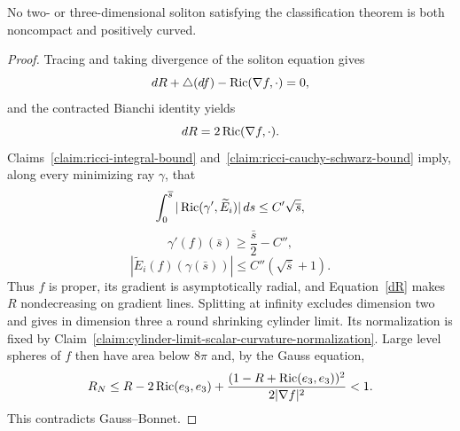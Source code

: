 \begin{proposition}\label{prop:no-noncompact-positive-curvature-soliton}
\label{noncompsol}

No two- or three-dimensional soliton satisfying the classification
theorem is both noncompact and positively curved.
\end{proposition}
\begin{proof}
\sketch Tracing and taking divergence of the soliton equation gives
\begin{equation}\label{Rfeqn}
 dR+\triangle(df)-\operatorname{Ric}(\nabla f,\cdot)=0,
\end{equation}
and the contracted Bianchi identity yields
\begin{equation}\label{dR}
 dR=2\operatorname{Ric}(\nabla f,\cdot).
\end{equation}
Claims~\ref{claim:ricci-integral-bound}
and~\ref{claim:ricci-cauchy-schwarz-bound} imply, along every
minimizing ray $\gamma$, that
\begin{equation}\label{sqrts}
 \int_0^{\overline s}|\operatorname{Ric}(\gamma',\widetilde E_i)|\,ds
 \leq C'\sqrt{\overline s},
\end{equation}
\begin{equation}\label{X}
 \gamma'(f)(\bar s)\geq\frac{\bar s}{2}-C'',
\end{equation}
\begin{equation}\label{sqrts2}
 |\widetilde E_i(f)(\gamma(\bar s))|
 \leq C''(\sqrt{\bar s}+1).
\end{equation}
Thus $f$ is proper, its gradient is asymptotically radial, and
Equation~\ref{dR} makes $R$ nondecreasing on gradient lines.
Splitting at infinity excludes dimension two and gives in dimension
three a round shrinking cylinder limit. Its normalization is fixed
by Claim~\ref{claim:cylinder-limit-scalar-curvature-normalization}.
Large level spheres of $f$ then have area below $8\pi$ and, by the
Gauss equation,
\begin{equation}\label{R_N}
 R_N\leq R-2\operatorname{Ric}(e_3,e_3)
 +\frac{(1-R+\operatorname{Ric}(e_3,e_3))^2}{2|\nabla f|^2}<1.
\end{equation}
This contradicts Gauss--Bonnet.
\end{proof}

